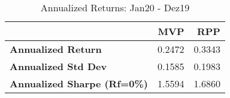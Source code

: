 \begin{table}
    \centering
      \begingroup
      \fontsize{9}{9}
      \selectfont 
\begin{tabular}{>{}lrr}
\toprule
  & MVP & RPP\\
\midrule
\textbf{Annualized Return} & 0.2472 & 0.3343\\
\textbf{Annualized Std Dev} & 0.1585 & 0.1983\\
\textbf{Annualized Sharpe (Rf=0\%)} & 1.5594 & 1.6860\\
\bottomrule
\end{tabular} \caption{Annualized Returns: Jan20 - Dez19}
      \label{tab:RPPVol1}  %
      \endgroup{}
      \end{table}